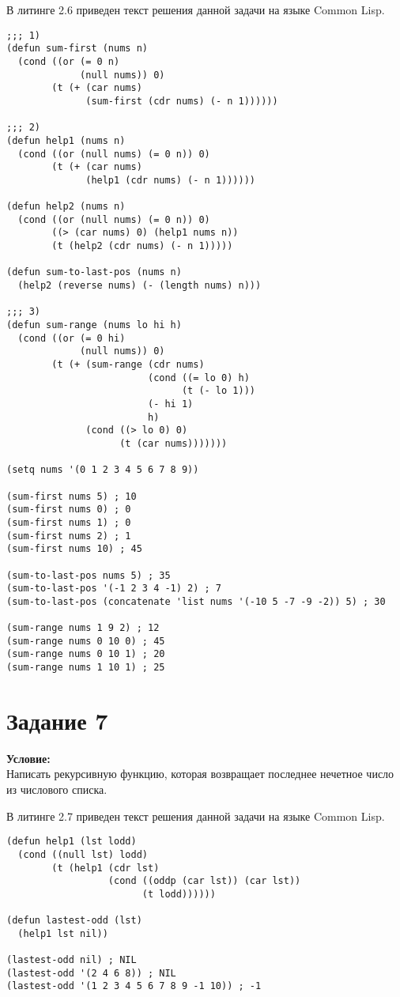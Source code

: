В литинге 2.6 приведен текст решения данной задачи на языке Common Lisp.

\begin{lstlisting}[caption={Задание \No{}6}]
;;; 1)
(defun sum-first (nums n)
  (cond ((or (= 0 n)
             (null nums)) 0)
        (t (+ (car nums)
              (sum-first (cdr nums) (- n 1))))))

;;; 2)
(defun help1 (nums n)
  (cond ((or (null nums) (= 0 n)) 0)
        (t (+ (car nums)
              (help1 (cdr nums) (- n 1))))))

(defun help2 (nums n)
  (cond ((or (null nums) (= 0 n)) 0)
        ((> (car nums) 0) (help1 nums n))
        (t (help2 (cdr nums) (- n 1)))))

(defun sum-to-last-pos (nums n)
  (help2 (reverse nums) (- (length nums) n)))

;;; 3)
(defun sum-range (nums lo hi h)
  (cond ((or (= 0 hi)
             (null nums)) 0)
        (t (+ (sum-range (cdr nums)
                         (cond ((= lo 0) h)
                               (t (- lo 1)))
                         (- hi 1)
                         h)
              (cond ((> lo 0) 0)
                    (t (car nums)))))))

(setq nums '(0 1 2 3 4 5 6 7 8 9))

(sum-first nums 5) ; 10
(sum-first nums 0) ; 0
(sum-first nums 1) ; 0
(sum-first nums 2) ; 1
(sum-first nums 10) ; 45

(sum-to-last-pos nums 5) ; 35
(sum-to-last-pos '(-1 2 3 4 -1) 2) ; 7
(sum-to-last-pos (concatenate 'list nums '(-10 5 -7 -9 -2)) 5) ; 30

(sum-range nums 1 9 2) ; 12
(sum-range nums 0 10 0) ; 45
(sum-range nums 0 10 1) ; 20
(sum-range nums 1 10 1) ; 25
\end{lstlisting}

\section{Задание \No{}7}
\textbf{Условие:}\\Написать рекурсивную функцию, которая возвращает последнее нечетное число из числового списка.

В литинге 2.7 приведен текст решения данной задачи на языке Common Lisp.

\begin{lstlisting}[caption={Задание \No{}7}]
(defun help1 (lst lodd)
  (cond ((null lst) lodd)
        (t (help1 (cdr lst)
                  (cond ((oddp (car lst)) (car lst))
                        (t lodd))))))

(defun lastest-odd (lst)
  (help1 lst nil))

(lastest-odd nil) ; NIL
(lastest-odd '(2 4 6 8)) ; NIL
(lastest-odd '(1 2 3 4 5 6 7 8 9 -1 10)) ; -1
\end{lstlisting}

